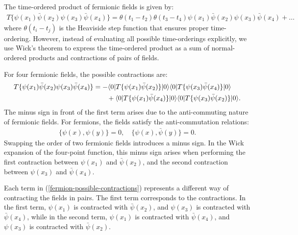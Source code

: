 The time-ordered product of fermionic fields is given by:
\begin{align}
    T \{ \psi(x_1) \bar{\psi}(x_2) \psi(x_3) \bar{\psi}(x_4) \} = \theta(t_1 - t_2) \theta(t_3 - t_4) \psi(x_1) \bar{\psi}(x_2) \psi(x_3) \bar{\psi}(x_4) + \dots
\end{align}
where $\theta(t_i - t_j)$ is the Heaviside step function that ensures proper time-ordering. However, instead of evaluating all possible time-orderings explicitly, we use Wick’s theorem to express the time-ordered product as a sum of normal-ordered products and contractions of pairs of fields.

For four fermionic fields, the possible contractions are:
\begin{align}
    T \{ \psi(x_1) \bar{\psi}(x_2) \psi(x_3) \bar{\psi}(x_4) \} &= - \langle 0 | T \{ \psi(x_1) \bar{\psi}(x_2) \} | 0 \rangle \langle 0 | T \{ \psi(x_3) \bar{\psi}(x_4) \} | 0 \rangle \notag \\
    &\qquad + \langle 0 | T \{ \psi(x_1) \bar{\psi}(x_4) \} | 0 \rangle \langle 0 | T \{ \psi(x_3) \bar{\psi}(x_2) \} | 0 \rangle.\label{fermion-possible-contractions}
\end{align}
The minus sign in front of the first term arises due to the anti-commuting nature of fermionic fields. For fermions, the fields satisfy the anti-commutation relations:
\begin{align*}
    \{ \psi(x), \psi(y) \} = 0, \quad \{ \psi(x), \bar{\psi}(y) \} = 0.
\end{align*}
Swapping the order of two fermionic fields introduces a minus sign. In the Wick expansion of the four-point function, this minus sign arises when performing the first contraction between $\psi(x_1)$ and $\bar{\psi}(x_2)$, and the second contraction between $\psi(x_3)$ and $\bar{\psi}(x_4)$.

Each term in (\ref{fermion-possible-contractions}) represents a different way of contracting the fields in pairs. The first term corresponds to the contractions. In the first term, $\psi(x_1)$ is contracted with $\bar{\psi}(x_2)$, and $\psi(x_3)$ is contracted with $\bar{\psi}(x_4)$, while in the second term, $\psi(x_1)$ is contracted with $\bar{\psi}(x_4)$, and $\psi(x_3)$ is contracted with $\bar{\psi}(x_2)$.

